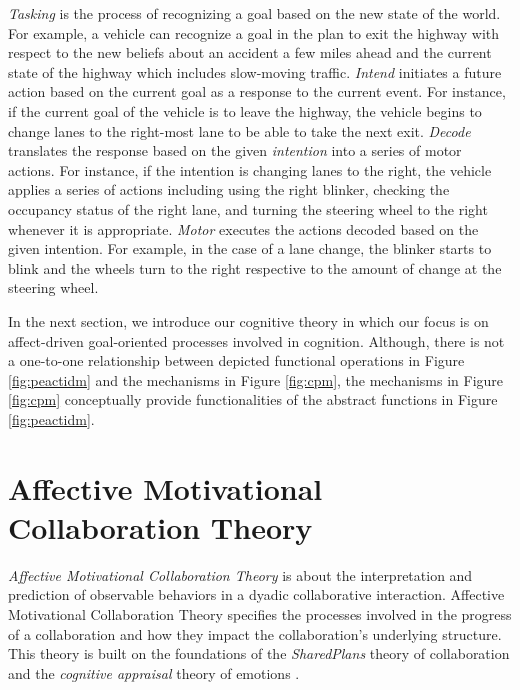 \documentclass[journal, 11pt]{IEEEtran}
\begin{document}
\textit{Tasking} is the process of recognizing a goal based on the new state of
the world. For example, a vehicle can recognize a goal in the plan to exit the
highway with respect to the new beliefs about an accident a few miles ahead and
the current state of the highway which includes slow-moving traffic.
\textit{Intend} initiates a future action based on the current goal as a
response to the current event. For instance, if the current goal of the vehicle
is to leave the highway, the vehicle begins to change lanes to the right-most
lane to be able to take the next exit. \textit{Decode} translates the response
based on the given \textit{intention} into a series of motor actions. For
instance, if the intention is changing lanes to the right, the vehicle applies a
series of actions including using the right blinker, checking the occupancy
status of the right lane, and turning the steering wheel to the right whenever
it is appropriate. \textit{Motor} executes the actions decoded based on the
given intention. For example, in the case of a lane change, the blinker starts
to blink and the wheels turn to the right respective to the amount of change at
the steering wheel.

In the next section, we introduce our cognitive theory in which our focus is on
affect-driven goal-oriented processes involved in cognition. Although, there is
not a one-to-one relationship between depicted functional operations in Figure
\ref{fig:peactidm} and the mechanisms in Figure \ref{fig:cpm}, the mechanisms in
Figure \ref{fig:cpm} conceptually provide functionalities of the abstract
functions in Figure \ref{fig:peactidm}. 

\section{{\fontsize{11.5}{9}\selectfont Affective Motivational Collaboration
Theory}}
\label{sec:amct}

\textit{Affective Motivational Collaboration Theory}
\cite{shayganfar:theory-overview} is about the interpretation and prediction of
observable behaviors in a dyadic collaborative interaction. Affective
Motivational Collaboration Theory specifies the processes involved in the
progress of a collaboration and how they impact the collaboration's underlying
structure. This theory is built on the foundations of the \textit{SharedPlans}
theory of collaboration \cite{grosz:plans-discourse} and the \textit{cognitive
appraisal} theory of emotions \cite{gratch:domain-independent}.
\end{document}
